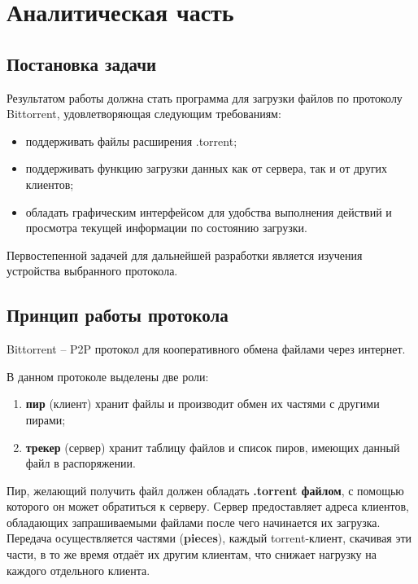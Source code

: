 \section{Аналитическая часть}

\subsection{Постановка задачи}
Результатом работы должна стать программа для загрузки файлов по протоколу Bittorrent, удовлетворяющая следующим требованиям:
\begin{itemize}
	\item поддерживать файлы расширения .torrent;
	
	\item поддерживать функцию загрузки данных как от сервера, так и от других клиентов;
	
	\item обладать графическим интерфейсом для удобства выполнения действий и просмотра текущей информации по состоянию загрузки.
	
\end{itemize}
%
Первостепенной задачей для дальнейшей разработки является изучения устройства выбранного протокола.
%
 \newline

\subsection{Принцип работы протокола}
Bittorrent -- P2P протокол для кооперативного обмена файлами через интернет. 

В данном протоколе выделены две роли:
\begin{enumerate}
	\item \textbf{пир} (клиент) хранит файлы и производит обмен их частями с другими пирами;
	
	\item \textbf{трекер} (сервер) хранит таблицу файлов и список пиров, имеющих данный файл в распоряжении. \newline
\end{enumerate}

Пир, желающий получить файл должен обладать \textbf{.torrent файлом}, с помощью которого он может обратиться к серверу. Сервер предоставляет адреса клиентов, обладающих запрашиваемыми файлами после чего начинается их загрузка. Передача осуществляется частями (\textbf{pieces}), каждый torrent-клиент, скачивая эти части, в то же время отдаёт их другим клиентам, что снижает нагрузку на каждого отдельного клиента. \newline

